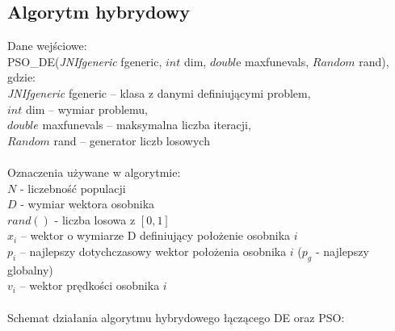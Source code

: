 \documentclass{article}
\begin{document}
\subsection{Algorytm hybrydowy}
Dane wejściowe:\\
PSO\_DE(\textit{JNIfgeneric} fgeneric, $int$ dim, $doubl$e maxfunevals, $Random$ rand), gdzie:\\
\textit{JNIfgeneric} fgeneric – klasa z danymi definiującymi problem,\\
$int$ dim – wymiar problemu,\\
$double$ maxfunevals – maksymalna liczba iteracji,\\
$Random$ rand – generator liczb losowych\\\\
Oznaczenia używane w algorytmie:\\
$N$ - liczebność populacji\\
$D$ - wymiar wektora osobnika\\
$rand()$ - liczba losowa z $[0,1]$\\
$x_i$ –  wektor o wymiarze D definiujący położenie osobnika $i$\\
$p_i$ – najlepszy dotychczasowy wektor położenia osobnika $i$ ($p_g$ - najlepszy globalny)\\
$v_i$ – wektor prędkości osobnika $i$\\\\
Schemat działania algorytmu hybrydowego łączącego DE oraz PSO:\\
\end{document}
